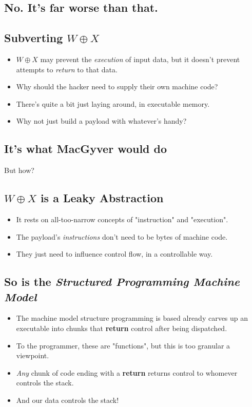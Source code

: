 \documentclass[11pt]{article}
\begin{document}
\subsection*{No. It's far worse than that.}
\label{sec:org65eb059}
\subsection*{Subverting \(W\oplus X\)}
\label{sec:org7aedc64}
\begin{itemize}
\item \(W\oplus X\) may prevent the \emph{execution} of input data, but it doesn't prevent attempts to \emph{return} to that data.
\item Why should the hacker need to supply their own machine code?
\item There's quite a bit just laying around, in executable memory.
\item Why not just build a payload with whatever's handy?
\end{itemize}
\subsection*{It's what MacGyver would do}
\label{sec:orgb0feb5f}
But how?
\subsection*{\(W\oplus X\) is a Leaky Abstraction}
\label{sec:orgdde5d2f}
\begin{itemize}
\item It rests on all-too-narrow concepts of "instruction" and "execution".
\item The payload's \emph{instructions} don't need to be bytes of machine code.
\item They just need to influence control flow, in a controllable way.
\end{itemize}
\subsection*{So is the \emph{Structured Programming Machine Model}}
\label{sec:org3afd5eb}
\begin{itemize}
\item The machine model structure programming is based already carves up an executable into chunks that \textbf{return} control after being dispatched.
\item To the programmer, these are "functions", but this is too granular a viewpoint.
\item \emph{Any} chunk of code ending with a \textbf{return} returns control to whomever controls the stack.
\item And our data controls the stack!
\end{itemize}
\end{document}
